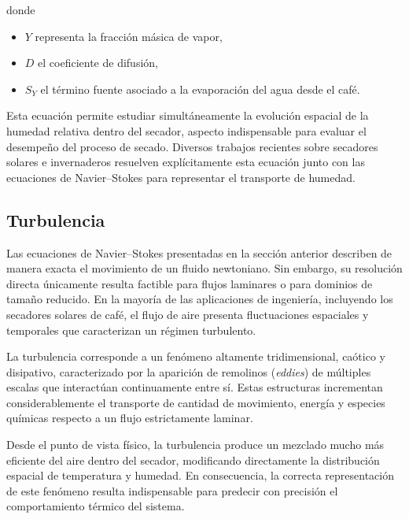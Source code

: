 donde

\begin{itemize}

\item $Y$ representa la fracción másica de vapor,

\item $D$ el coeficiente de difusión,

\item $S_Y$ el término fuente asociado a la evaporación del agua desde el café.
\end{itemize}

Esta ecuación permite estudiar simultáneamente la evolución espacial de la humedad relativa dentro del secador, aspecto indispensable para evaluar el desempeño del proceso de secado. Diversos trabajos recientes sobre secadores solares e invernaderos resuelven explícitamente esta ecuación junto con las ecuaciones de Navier--Stokes para representar el transporte de humedad. 

\subsection{Turbulencia}

Las ecuaciones de Navier--Stokes presentadas en la sección anterior describen de manera exacta el movimiento de un fluido newtoniano. Sin embargo, su resolución directa únicamente resulta factible para flujos laminares o para dominios de tamaño reducido. En la mayoría de las aplicaciones de ingeniería, incluyendo los secadores solares de café, el flujo de aire presenta fluctuaciones espaciales y temporales que caracterizan un régimen turbulento.

La turbulencia corresponde a un fenómeno altamente tridimensional, caótico y disipativo, caracterizado por la aparición de remolinos (\textit{eddies}) de múltiples escalas que interactúan continuamente entre sí. Estas estructuras incrementan considerablemente el transporte de cantidad de movimiento, energía y especies químicas respecto a un flujo estrictamente laminar.

Desde el punto de vista físico, la turbulencia produce un mezclado mucho más eficiente del aire dentro del secador, modificando directamente la distribución espacial de temperatura y humedad. En consecuencia, la correcta representación de este fenómeno resulta indispensable para predecir con precisión el comportamiento térmico del sistema.

